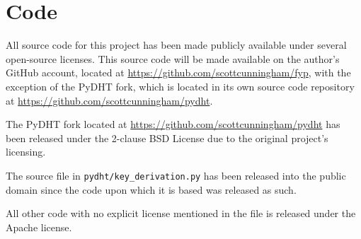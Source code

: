 
\chapter{Code}

All source code for this project has been made publicly available under several open-source licenses.
This source code will be made available on the author's GitHub account, located at
\url{https://github.com/scottcunningham/fyp}, with the exception of the PyDHT fork, which is located
in its own source code repository at \url{https://github.com/scottcunningham/pydht}.

The PyDHT fork located at \url{https://github.com/scottcunningham/pydht} has been released under
the 2-clause BSD License due to the original project's licensing.

The source file in \texttt{pydht/key\_derivation.py} has been released into the public domain since
the code upon which it is based was released as such.

All other code with no explicit license mentioned in the file is released under the Apache license.